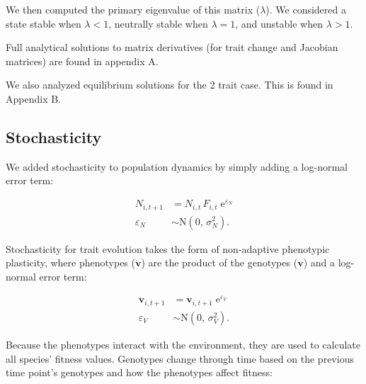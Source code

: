 \noindent We then computed the primary eigenvalue of this matrix ($\lambda$).
We considered a state stable when $\lambda < 1$,
neutrally stable when $\lambda = 1$,
and unstable when $\lambda > 1$.

Full analytical solutions to matrix derivatives (for trait change and
Jacobian matrices) are found in appendix A.

We also analyzed equilibrium solutions for the 2 trait case.
This is found in Appendix B.


\subsection*{Stochasticity}

We added stochasticity to population dynamics by simply adding 
a log-normal error term:

\begin{equation} \label{eq:N-stochasticity}
\begin{split}
    N_{i,t+1} &= N_{i,t} \, F_{i,t} \; \text{e}^{\varepsilon_N} \\
    \varepsilon_N &\sim \text{N}(0, \, \sigma^2_N)
    \text{.}
\end{split}
\end{equation}


Stochasticity for trait evolution takes the form of non-adaptive
phenotypic plasticity,
where phenotypes ($\mathbf{\ddot{v}}$) are the product of the
genotypes ($\mathbf{v}$) and a log-normal error term:

\begin{equation} \label{eq:V-stochasticity}
\begin{split}
    \mathbf{\ddot{v}}_{i,t+1} &= \mathbf{v}_{i,t+1} \; \text{e}^{\varepsilon_V} \\
    \varepsilon_V &\sim \text{N}(0, \, \sigma^2_V)
    \text{.}
\end{split}
\end{equation}


Because the phenotypes interact with the environment, they are used
to calculate all species' fitness values.
Genotypes change through time based on the previous time point's 
genotypes and how the phenotypes affect fitness:

